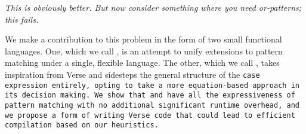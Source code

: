 \documentclass[manuscript,screen,review, 12pt]{acmart}
\begin{document}
\it{This is obviously better. But now consider something where you need 
or-patterns; this fails. }

We make a contribution to this problem in the form of two small functional
languages. One, which we call \PPlus, is an attempt to unify extensions to
pattern matching under a single, flexible language. The other, which we call
\VMinus, takes inspiration from Verse and sidesteps the general structure of the
\tt{case} expression entirely, opting to take a more equation-based approach in
its decision making. We show that \PPlus and \VMinus have all the expressiveness
of pattern matching with no additional significant runtime overhead, and we
propose a form of writing Verse code that could lead to efficient compilation
based on our heuristics. 






    
    
    
\end{document}
